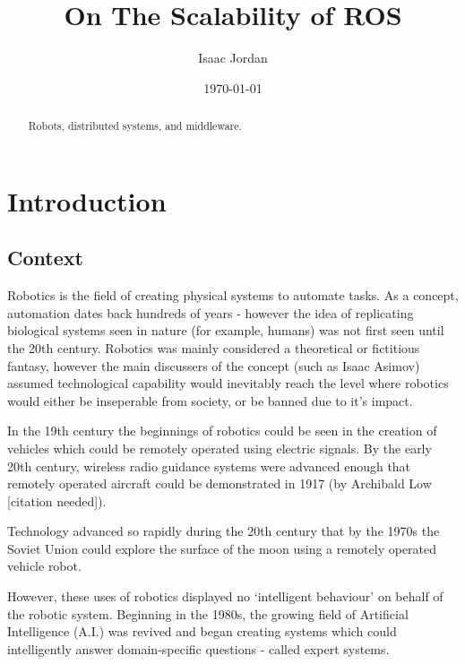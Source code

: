 \documentclass{l4proj}
\begin{document}
\title{On The Scalability of ROS}
\author{Isaac Jordan}
\date{\today}
\maketitle

\begin{abstract}
Robots, distributed systems, and middleware.
\end{abstract}

\educationalconsent
%
%
\tableofcontents

\chapter{Introduction}

\section{Context}

Robotics is the field of creating physical systems to automate tasks. As a concept, automation dates back hundreds of years - however the idea of replicating biological systems seen in nature (for example, humans) was not first seen until the 20th century. Robotics was mainly considered a theoretical or fictitious fantasy, however the main discussers of the concept (such as Isaac Asimov) assumed technological capability would inevitably reach the level where robotics would either be inseperable from society, or be banned due to it's impact.

In the 19th century the beginnings of robotics could be seen in the creation of vehicles which could be remotely operated using electric signals. By the early 20th century, wireless radio guidance systems were advanced enough that remotely operated aircraft could be demonstrated in 1917 (by Archibald Low [citation needed]).

Technology advanced so rapidly during the 20th century that by the 1970s the Soviet Union could explore the surface of the moon using a remotely operated vehicle robot.

However, these uses of robotics displayed no `intelligent behaviour' on behalf of the robotic system. Beginning in the 1980s, the growing field of Artificial Intelligence (A.I.) was revived and began creating systems which could intelligently answer domain-specific questions - called expert systems. 
\end{document}
